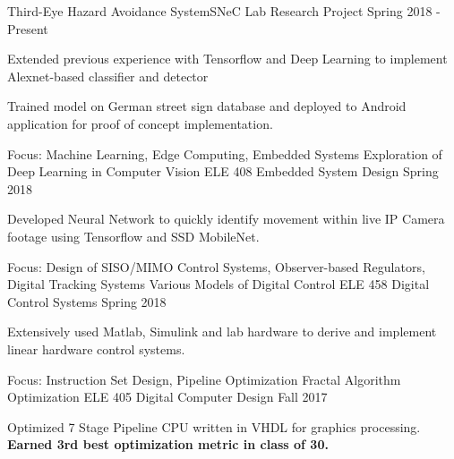 \graduateheader
\begin{cvprojectentries}
  {Third-Eye Hazard Avoidance System}{SNeC Lab Research Project}
  {Spring 2018 - Present}
  {
    \begin{cvitems}
        \item{Extended previous experience with Tensorflow and Deep Learning to implement Alexnet-based classifier and detector}
        \item{Trained model on German street sign database and deployed to Android application for proof of concept implementation.}
    \end{cvitems}
  }
\end{cvprojectentries}
\ugradheader
\begin{cvprojectentries}
  \cvprojectentry
    {Focus: Machine Learning, Edge Computing, Embedded Systems}
    {Exploration of Deep Learning in Computer Vision}
    {ELE 408 {\cdotp} Embedded System Design}
    {Spring 2018}
    {
      \begin{cvitems}
        \item{Developed Neural Network to quickly identify movement within live IP Camera footage using Tensorflow and SSD MobileNet.}
      \end{cvitems}
    }
  \cvprojectentry
    {Focus: Design of SISO/MIMO Control Systems, Observer-based Regulators, Digital Tracking Systems}
    {Various Models of Digital Control}
    {ELE 458 {\cdotp} Digital Control Systems}
    {Spring 2018}
    {
      \begin{cvitems}
        \item {Extensively used Matlab, Simulink and lab hardware to derive and implement linear hardware control systems.}
      \end{cvitems}
    }
  \cvprojectentry
    {Focus: Instruction Set Design, Pipeline Optimization}
    {Fractal Algorithm Optimization}
    {ELE 405 {\cdotp} Digital Computer Design}
    {Fall 2017}
    {
      \begin{cvitems}
        \item {Optimized 7 Stage Pipeline CPU written in VHDL for graphics processing. \textbf{Earned 3rd best optimization metric in class of 30.}}
      \end{cvitems}
    }
\end{cvprojectentries}
